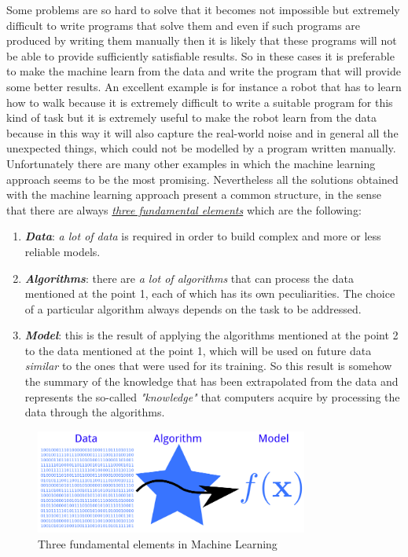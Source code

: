 \newpage

Some problems are so hard to solve that it becomes not impossible but
extremely difficult to write programs that solve them and even if such
programs are produced by writing them manually then it is likely that
these programs will not be able to provide sufficiently satisfiable
results. So in these cases it is preferable to make the machine learn
from the data and write the program that will provide some better
results. An excellent example is for instance a robot that has to learn
how to walk because it is extremely difficult to write a suitable
program for this kind of task but it is extremely useful to make the
robot learn from the data because in this way it will also capture the
real-world noise and in general all the unexpected things, which could
not be modelled by a program written manually. Unfortunately there are
many other examples in which the machine learning approach seems to be
the most promising. Nevertheless all the solutions obtained with the
machine learning approach present a common structure, in the sense that
there are always \underline{\emph{three fundamental elements}} which are
the following:

\begin{enumerate}
    \item \emph{\textbf{Data}}: \emph{a lot of data} is required in
          order to build complex and more or less reliable models.
    \item \emph{\textbf{Algorithms}}: there are \emph{a lot of
              algorithms} that can process the data mentioned at the
          point 1, each of which has its own peculiarities. The
          choice of a particular algorithm always depends on the
          task to be addressed.
    \item \emph{\textbf{Model}}: this is the result of applying the
          algorithms mentioned at the point 2 to the data mentioned at
          the point 1, which will be used on future data \emph{similar}
          to the ones that were used for its training. So this result is
          somehow the summary of the knowledge that has been
          extrapolated from the data and represents the so-called
          \emph{"knowledge"} that computers acquire by processing the
          data through the algorithms.
\end{enumerate}

\vspace{5mm}

\begin{figure}[h]
    \centering
    \includegraphics[width=0.8\textwidth]{../img/Data_algorithm_model}
    \caption{Three fundamental elements in Machine Learning}
\end{figure}

